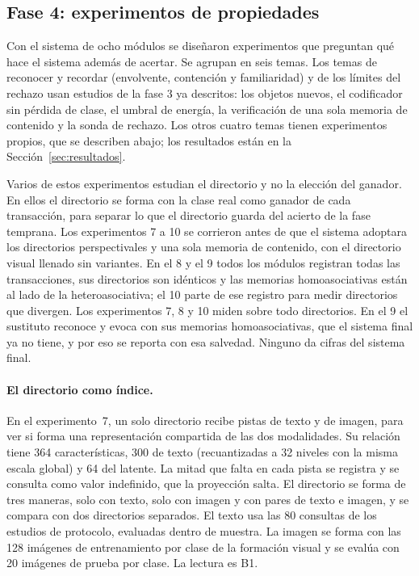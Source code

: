 \subsection{Fase 4: experimentos de propiedades}
\label{fase4:propiedades}

Con el sistema de ocho módulos se diseñaron experimentos que preguntan qué hace el
sistema además de acertar.
Se agrupan en seis temas.
Los temas de reconocer y recordar (envolvente, contención y familiaridad) y de los
límites del rechazo usan estudios de la fase 3 ya descritos: los objetos nuevos, el
codificador sin pérdida de clase, el umbral de energía, la verificación de una sola
memoria de contenido y la sonda de rechazo.
Los otros cuatro temas tienen experimentos propios, que se describen abajo; los
resultados están en la Sección~\ref{sec:resultados}.

Varios de estos experimentos estudian el directorio y no la elección del ganador.
En ellos el directorio se forma con la clase real como ganador de cada transacción, para
separar lo que el directorio guarda del acierto de la fase temprana.
Los experimentos 7 a 10 se corrieron antes de que el sistema adoptara los directorios
perspectivales y una sola memoria de contenido, con el directorio visual llenado sin
variantes.
En el 8 y el 9 todos los módulos registran todas las transacciones, sus directorios son
idénticos y las memorias homoasociativas están al lado de la heteroasociativa; el 10
parte de ese registro para medir directorios que divergen.
Los experimentos 7, 8 y 10 miden sobre todo directorios.
En el 9 el sustituto reconoce y evoca con sus memorias homoasociativas, que el sistema
final ya no tiene, y por eso se reporta con esa salvedad.
Ninguno da cifras del sistema final.

\paragraph{El directorio como índice.}
En el experimento~7, un solo directorio recibe pistas de texto y de imagen, para ver si
forma una representación compartida de las dos modalidades.
Su relación tiene 364 características, 300 de texto (recuantizadas a 32 niveles con la
misma escala global) y 64 del latente.
La mitad que falta en cada pista se registra y se consulta como valor indefinido, que la
proyección salta.
El directorio se forma de tres maneras, solo con texto, solo con imagen y con pares de
texto e imagen, y se compara con dos directorios separados.
El texto usa las 80 consultas de los estudios de protocolo, evaluadas dentro de muestra.
La imagen se forma con las 128 imágenes de entrenamiento por clase de la formación
visual y se evalúa con 20 imágenes de prueba por clase.
La lectura es B1.

